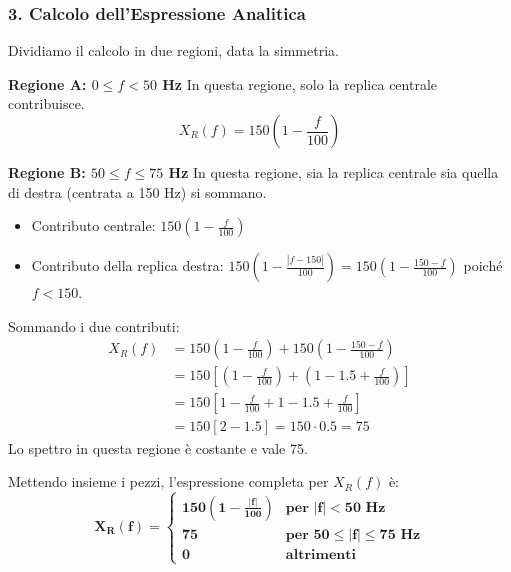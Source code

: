 \begin{soluzione}{7}
    \subsubsection*{3. Calcolo dell'Espressione Analitica}
    Dividiamo il calcolo in due regioni, data la simmetria.
    
    \textbf{Regione A: $0 \le f < 50$ Hz}
    In questa regione, solo la replica centrale contribuisce.
    \[
        X_R(f) = 150 \left(1 - \frac{f}{100}\right)
    \]
    
    \textbf{Regione B: $50 \le f \le 75$ Hz}
    In questa regione, sia la replica centrale sia quella di destra (centrata a 150 Hz) si sommano.
    \begin{itemize}
        \item Contributo centrale: $150 \left(1 - \frac{f}{100}\right)$
        \item Contributo della replica destra: $150 \left(1 - \frac{|f-150|}{100}\right) = 150 \left(1 - \frac{150-f}{100}\right)$ poiché $f < 150$.
    \end{itemize}
    Sommando i due contributi:
    \begin{align*}
        X_R(f) &= 150 \left(1 - \frac{f}{100}\right) + 150 \left(1 - \frac{150-f}{100}\right) \\
        &= 150 \left[ \left(1 - \frac{f}{100}\right) + \left(1 - 1.5 + \frac{f}{100}\right) \right] \\
        &= 150 \left[ 1 - \frac{f}{100} + 1 - 1.5 + \frac{f}{100} \right] \\
        &= 150 \left[ 2 - 1.5 \right] = 150 \cdot 0.5 = 75
    \end{align*}
    Lo spettro in questa regione è costante e vale 75.

    Mettendo insieme i pezzi, l'espressione completa per $X_R(f)$ è:
    \[ \mathbf{X_R(f) = 
        \begin{cases} 
            150 \left(1 - \frac{|f|}{100}\right) & \text{per } |f| < 50 \text{ Hz} \\
            75 & \text{per } 50 \le |f| \le 75 \text{ Hz} \\
            0 & \text{altrimenti}
        \end{cases}}
    \]


\end{soluzione}
